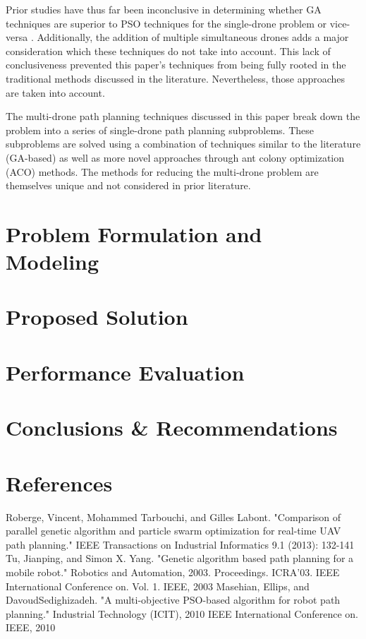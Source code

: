 \documentclass[conference]{IEEEtran}
\begin{document}
Prior studies have thus far been inconclusive in determining whether GA techniques are superior to PSO techniques for the single-drone problem \cite{b2} or vice-versa \cite{b3}. Additionally, the addition of multiple simultaneous drones adds a major consideration which these techniques do not take into account. This lack of conclusiveness prevented this paper's techniques from being fully rooted in the traditional methods discussed in the literature. Nevertheless, those approaches are taken into account.

The multi-drone path planning techniques discussed in this paper break down the problem into a series of single-drone path planning subproblems. These subproblems are solved using a combination of techniques similar to the literature (GA-based) as well as more novel approaches through ant colony optimization (ACO) methods. The methods for reducing the multi-drone problem are themselves unique and not considered in prior literature.

\section{Problem Formulation and Modeling}
\blindtext

\section{Proposed Solution}
\blindtext

\section{Performance Evaluation}
\blindtext

\section{Conclusions \& Recommendations}
\blindtext

\section*{References}

\begin{thebibliography}{00}
 Roberge, Vincent, Mohammed Tarbouchi, and Gilles Labont. "Comparison of parallel genetic algorithm and particle swarm optimization for real-time UAV path planning." IEEE Transactions on Industrial Informatics 9.1 (2013): 132-141
 Tu, Jianping, and Simon X. Yang. "Genetic algorithm based path planning for a mobile robot." Robotics and Automation, 2003. Proceedings. ICRA'03. IEEE International Conference on. Vol. 1. IEEE, 2003
 Masehian, Ellips, and DavoudSedighizadeh. "A multi-objective PSO-based algorithm for robot path planning." Industrial Technology (ICIT), 2010 IEEE International Conference on. IEEE, 2010
\end{thebibliography}
\end{document}
